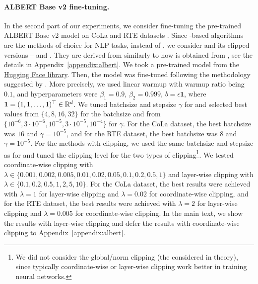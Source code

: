 \documentclass{article}
\begin{document}
\paragraph{ALBERT Base v2 fine-tuning.} In the second part of our experiments, we consider fine-tuning the pre-trained ALBERT Base v2 model \citep{lan2019albert} on CoLa and RTE datasets \citep{wang2018glue}. Since -based algorithms are the methods of choice for NLP tasks, instead of , we consider  and its clipped versions --  and . They are derived from  similarly to how  is obtained from , see the details in Appendix~\ref{appendix:albert}. We took a pre-trained model from the \href{https://huggingface.co/albert/albert-base-v2}{Hugging Face library}. Then, the model was fine-tuned following the methodology suggested by \citet{mosbach2020stability}. More precisely, we used linear warmup with warmup ratio being $0.1$, and hyperparameters were $\beta_1 = 0.9$, $\beta_2 = 0.999$, $b = \epsilon \bm{1}$, where $\bm{1} = (1,1,\ldots, 1)^\top \in {\mathbb R}^d$. We tuned batchsize and stepsize $\gamma$ for  and selected best values from $\{4, 8, 16, 32\}$ for the batchsize and from $\{10^{-6}, 3\cdot 10^{-6}, 10^{-5}, 3\cdot 10^{-5}, 10^{-4}\}$ for $\gamma$. For the CoLa dataset, the best batchsize was $16$ and $\gamma = 10^{-5}$, and for the RTE dataset, the best batchsize was $8$ and $\gamma = 10^{-5}$. For the methods with clipping, we used the same batchsize and stepsize as for  and tuned the clipping level for the two types of clipping\footnote{We did not consider the global/norm clipping (the considered in theory), since typically coordinate-wise or layer-wise clipping work better in training neural networks.}. We tested coordinate-wise clipping with $\lambda \in \{0.001, 0.002, 0.005, 0.01, 0.02, 0.05, 0.1, 0.2, 0.5, 1\}$ and layer-wise clipping with $\lambda \in \{0.1, 0.2, 0.5, 1, 2, 5, 10\}$. For the CoLa dataset, the best results were achieved with $\lambda = 1$ for layer-wise clipping and $\lambda = 0.02$ for coordinate-wise clipping, and for the RTE dataset, the best results were achieved with $\lambda = 2$ for layer-wise clipping and $\lambda = 0.005$ for coordinate-wise clipping. In the main text, we show the results with layer-wise clipping and defer the results with coordinate-wise clipping to Appendix~\ref{appendix:albert}.
\end{document}
